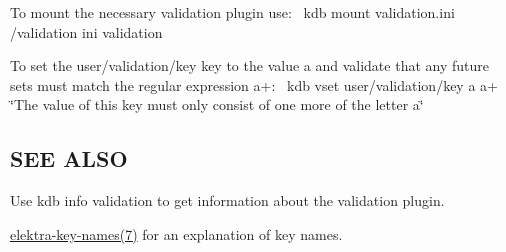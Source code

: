 To mount the necessary validation plugin use\+:~\newline
 {\ttfamily kdb mount validation.\+ini /validation ini validation}

To set the {\ttfamily user/validation/key} key to the value {\ttfamily a} and validate that any future sets must match the regular expression {\ttfamily a+}\+:~\newline
 {\ttfamily kdb vset user/validation/key a a+ \char`\"{}\+The value of this key must only consist of one more of the letter a\char`\"{}}

\subsection*{S\+EE A\+L\+SO}


\begin{DoxyItemize}
\item Use {\ttfamily kdb info validation} to get information about the validation plugin.
\item \hyperlink{md_doc_help_elektra-key-names_doc_help_elektra-key-names_md}{elektra-\/key-\/names(7)} for an explanation of key names. 
\end{DoxyItemize}